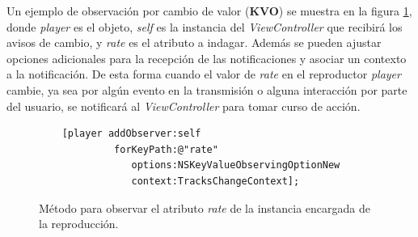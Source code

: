 Un ejemplo de observación por cambio de valor (\textbf{KVO}) se muestra en la figura \ref{exampleCodeObserver}, donde \textit{player} es el objeto, \textit{self} es la instancia del \textit{ViewController} que recibirá los avisos de cambio, y \textit{rate} es el atributo a indagar. Además se pueden ajustar opciones adicionales para la recepción de las notificaciones y asociar un contexto a la notificación. De esta forma cuando el valor de \textit{rate} en el reproductor \textit{player} cambie, ya sea por algún evento en la transmisión o alguna interacción por parte del usuario, se notificará al \textit{ViewController} para tomar curso de acción.
\begin{figure}[H]
	\centering
	\begin{lstlisting}
	[player addObserver:self  
			 forKeyPath:@"rate"
		        options:NSKeyValueObservingOptionNew
		        context:TracksChangeContext];
	\end{lstlisting}
	\caption{Método para observar el atributo \textit{rate} de la instancia encargada de la reproducción.}
	\label{exampleCodeObserver}	
\end{figure}	
  
